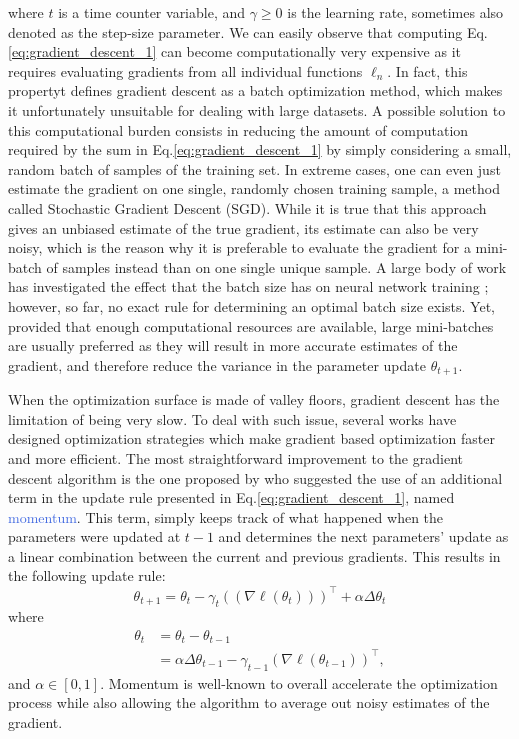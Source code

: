 where $t$ is a time counter variable, and $\gamma\geq0$ is the learning rate, sometimes also denoted as the step-size parameter. We can easily observe that computing Eq. \ref{eq:gradient_descent_1} can become computationally very expensive as it requires evaluating gradients from all individual functions $\ell_n$. In fact, this propertyt defines gradient descent as a batch optimization method, which makes it unfortunately unsuitable for dealing with large datasets. A possible solution to this computational burden consists in reducing the amount of computation required by the sum in Eq.\ref{eq:gradient_descent_1} by simply considering a small, random batch of samples of the training set. In extreme cases, one can even just estimate the gradient on one single, randomly chosen training sample, a method called Stochastic Gradient Descent (SGD). While it is true that this approach gives an unbiased estimate of the true gradient, its estimate can also be very noisy, which is the reason why it is preferable to evaluate the gradient for a mini-batch of samples instead than on one single unique sample. A large body of work has investigated the effect that the batch size has on neural network training \cite{keskar2016large,radiuk2017impact,kandel2020effect}; however, so far, no exact rule for determining an optimal batch size exists. Yet, provided that enough computational resources are available, large mini-batches are usually preferred as they will result in more accurate estimates of the gradient, and therefore reduce the variance in the parameter update $\theta_{t+1}$. 

When the optimization surface is made of valley floors, gradient descent has the limitation of being very slow. To deal with such issue, several works have designed optimization strategies which make gradient based optimization faster and more efficient. The most straightforward improvement to the gradient descent algorithm is the one proposed by \citet{rumelhart1986learning} who suggested the use of an additional term in the update rule presented in Eq.\ref{eq:gradient_descent_1}, named \textcolor{RoyalBlue}{momentum}. This term, simply keeps track of what happened when the parameters were updated at $t-1$ and determines the next parameters' update as a linear combination between the current and previous gradients. This results in the following update rule:
\begin{equation}
	\theta_{t+1} = \theta_t - \gamma_t ((\nabla \ell(\theta_t)))^{\intercal} + \alpha\Delta\theta_t
	\label{eq: momentum}
\end{equation}
where  
\begin{equation}
	\begin{split}
	\theta_{t} & = \theta_t - \theta_{t-1} \\ 
		   & = \alpha\Delta\theta_{t-1}-\gamma_{t-1}(\nabla \ell(\theta_{t-1}))^{\intercal},
	\end{split}
\label{eq:gradient_descent}
\end{equation}
and $\alpha\in[0,1]$. Momentum is well-known to overall accelerate the optimization process while also allowing the algorithm to average out noisy estimates of the gradient.

